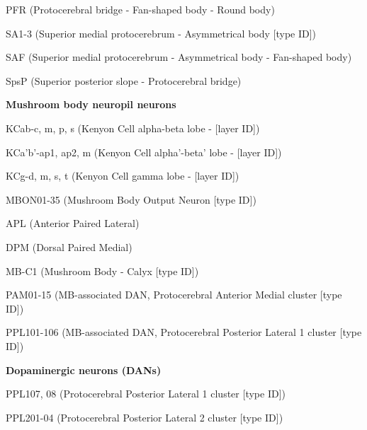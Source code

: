 \documentclass{article}
\begin{document}
{\noindent\hspace*{1.0em}PFR (Protocerebral bridge - Fan-shaped body - Round body)\par
\noindent\hspace*{1.0em}SA1-3 (Superior medial protocerebrum - Asymmetrical body [type ID])\par
\noindent\hspace*{1.0em}SAF (Superior medial protocerebrum - Asymmetrical body - Fan-shaped body)\par
\noindent\hspace*{1.0em}SpsP (Superior posterior slope - Protocerebral bridge)\par
\noindent\textbf{Mushroom body neuropil neurons}\par
\noindent\hspace*{1.0em}KCab-c, m, p, s (Kenyon Cell alpha-beta lobe - [layer ID])\par
\noindent\hspace*{1.0em}KCa’b’-ap1, ap2, m (Kenyon Cell alpha’-beta’ lobe - [layer ID])\par
\noindent\hspace*{1.0em}KCg-d, m, s, t (Kenyon Cell gamma lobe - [layer ID])\par
\noindent\hspace*{1.0em}MBON01-35 (Mushroom Body Output Neuron [type ID])\par
\noindent\hspace*{1.0em}APL (Anterior Paired Lateral)\par
\noindent\hspace*{1.0em}DPM (Dorsal Paired Medial)\par
\noindent\hspace*{1.0em}MB-C1 (Mushroom Body - Calyx [type ID])\par
\noindent\hspace*{1.0em}PAM01-15 (MB-associated DAN, Protocerebral Anterior Medial cluster [type ID])\par
\noindent\hspace*{1.0em}PPL101-106 (MB-associated DAN, Protocerebral Posterior Lateral 1 cluster [type ID])\par
\noindent\textbf{Dopaminergic neurons (DANs)}\par
\noindent\hspace*{1.0em}PPL107, 08 (Protocerebral Posterior Lateral 1 cluster [type ID])\par
\noindent\hspace*{1.0em}PPL201-04 (Protocerebral Posterior Lateral 2 cluster [type ID])\par
}
\end{document}
